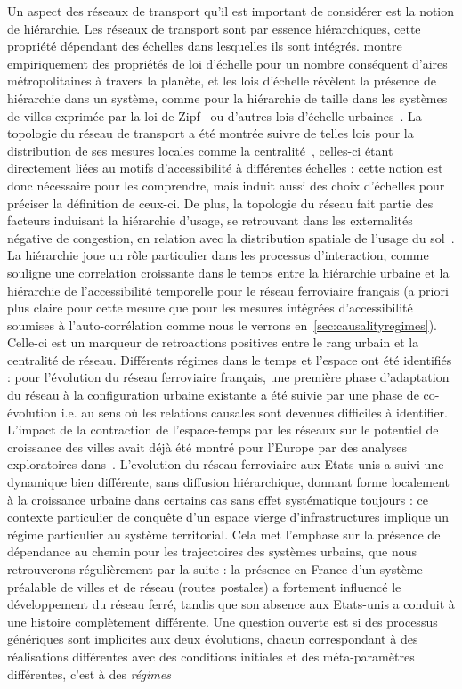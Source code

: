 {}{
Un aspect des réseaux de transport qu'il est important de considérer est la notion de hiérarchie. Les réseaux de transport sont par essence hiérarchiques, cette propriété dépendant des échelles dans lesquelles ils sont intégrés. \cite{10.1371/journal.pone.0102007} montre empiriquement des propriétés de loi d'échelle pour un nombre conséquent d'aires métropolitaines à travers la planète, et les lois d'échelle révèlent la présence de hiérarchie dans un système, comme pour la hiérarchie de taille dans les systèmes de villes exprimée par la loi de Zipf~\cite{nitsch2005zipf} ou d'autres lois d'échelle urbaines~\cite{2013arXiv1301.1674A,2015arXiv151000902B}. La topologie du réseau de transport a été montrée suivre de telles lois pour la distribution de ses mesures locales comme la centralité~\cite{samaniego2008cities}, celles-ci étant directement liées au motifs d'accessibilité à différentes échelles : cette notion est donc nécessaire pour les comprendre, mais induit aussi des choix d'échelles pour préciser la définition de ceux-ci. De plus, la topologie du réseau fait partie des facteurs induisant la hiérarchie d'usage, se retrouvant dans les externalités négative de congestion, en relation avec la distribution spatiale de l'usage du sol~\cite{Tsekeris20131}. La hiérarchie joue un rôle particulier dans les processus d'interaction, comme ~\cite{bretagnolle:tel-00459720} souligne une correlation croissante dans le temps entre la hiérarchie urbaine et la hiérarchie de l'accessibilité temporelle pour le réseau ferroviaire français (a priori plus claire pour cette mesure que pour les mesures intégrées d'accessibilité soumises à l'auto-corrélation comme nous le verrons en~\ref{sec:causalityregimes}). Celle-ci est un marqueur de retroactions positives entre le rang urbain et la centralité de réseau. Différents régimes dans le temps et l'espace ont été identifiés : pour l'évolution du réseau ferroviaire français, une première phase d'adaptation du réseau à la configuration urbaine existante a été suivie par une phase de co-évolution i.e. au sens où les relations causales sont devenues difficiles à identifier. L'impact de la contraction de l'espace-temps par les réseaux sur le potentiel de croissance des villes avait déjà été montré pour l'Europe par des analyses exploratoires dans~\cite{bretagnolle1998space}. L'evolution du réseau ferroviaire aux Etats-unis a suivi une dynamique bien différente, sans diffusion hiérarchique, donnant forme localement à la croissance urbaine dans certains cas sans effet systématique toujours : ce contexte particulier de conquête d'un espace vierge d'infrastructures implique un régime particulier au système territorial. Cela met l'emphase sur la présence de dépendance au chemin pour les trajectoires des systèmes urbains, que nous retrouverons régulièrement par la suite : la présence en France d'un système préalable de villes et de réseau (routes postales) a fortement influencé le développement du réseau ferré, tandis que son absence aux Etats-unis a conduit à une histoire complètement différente. Une question ouverte est si des processus génériques sont implicites aux deux évolutions, chacun correspondant à des réalisations différentes avec des conditions initiales et des méta-paramètres différentes, c'est à des \emph{régimes} }
